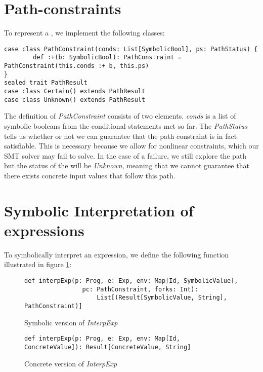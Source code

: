 \section{Path-constraints}
To represent a \pc, we implement the following classes:

\begin{lstlisting}[style=simple]
case class PathConstraint(conds: List[SymbolicBool], ps: PathStatus) {
		def :+(b: SymbolicBool): PathConstraint = PathConstraint(this.conds :+ b, this.ps)
}
sealed trait PathResult
case class Certain() extends PathResult
case class Unknown() extends PathResult
\end{lstlisting}

The definition of \textsl{PathConstraint} consists of two elements. \textsl{conds} is a  list of symbolic booleans from the conditional statements met so far. The \textsl{PathStatus} tells us whether or not we can guarantee that the path constraint is in fact satisfiable. This is necessary because we allow for nonlinear constraints, which our SMT solver may fail to solve. In the case of a failure, we still explore the path but the status of the \pc will be \textsl{Unknown}, meaning that we cannot guarantee that there exists concrete input values that follow this path.

\section{Symbolic Interpretation of expressions}
To symbolically interpret an expression, we define the following function illustrated in figure \ref{interpExpSymbolic}:

\begin{figure}[!h]
	\begin{lstlisting}[style = simple]
		def interpExp(p: Prog, e: Exp, env: Map[Id, SymbolicValue], 
				pc: PathConstraint, forks: Int): 		
					List[(Result[SymbolicValue, String], PathConstraint)]
	\end{lstlisting}
	\caption{Symbolic version of \textsl{InterpExp}}	
	\label{interpExpSymbolic}
\end{figure}

\begin{figure}[!h]
	\begin{lstlisting}[style = simple]
		def interpExp(p: Prog, e: Exp, env: Map[Id, ConcreteValue]): Result[ConcreteValue, String]
	\end{lstlisting}
	\caption{Concrete version of \textsl{InterpExp}}
	\label{interpExpConcrete}
\end{figure}
\newpage

